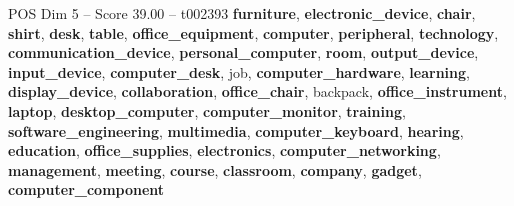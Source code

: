 \begin{textsample}{POS Dim 5 – Score 39.00 – t002393}  \label{ex:f5_pos_004}
\textbf{furniture}, \textbf{electronic\_device}, \textbf{chair}, \textbf{shirt}, \textbf{desk}, \textbf{table}, \textbf{office\_equipment}, \textbf{computer}, \textbf{peripheral}, \textbf{technology}, \textbf{communication\_device}, \textbf{personal\_computer}, \textbf{room}, \textbf{output\_device}, \textbf{input\_device}, \textbf{computer\_desk}, job, \textbf{computer\_hardware}, \textbf{learning}, \textbf{display\_device}, \textbf{collaboration}, \textbf{office\_chair}, backpack, \textbf{office\_instrument}, \textbf{laptop}, \textbf{desktop\_computer}, \textbf{computer\_monitor}, \textbf{training}, \textbf{software\_engineering}, \textbf{multimedia}, \textbf{computer\_keyboard}, \textbf{hearing}, \textbf{education}, \textbf{office\_supplies}, \textbf{electronics}, \textbf{computer\_networking}, \textbf{management}, \textbf{meeting}, \textbf{course}, \textbf{classroom}, \textbf{company}, \textbf{gadget}, \textbf{computer\_component}

\end{textsample}
